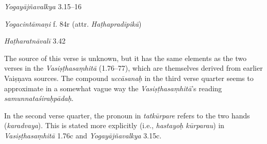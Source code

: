 \begin{ekdosis}
\begin{sources}[hp01_030]
\emph{Yogayājñavalkya} 3.15–16

\begin{versinnote}
\end{versinnote}

\end{sources}

\begin{testimonia}[hp01_030]
\emph{Yogacintāmaṇi} f. 84r (attr. \emph{Haṭhapradīpikā})

\begin{versinnote}
\end{versinnote}

\emph{Haṭharatnāvalī} 3.42

\begin{versinnote}
\end{versinnote}

\end{testimonia}

\begin{philcomm}[hp01_030]
%
The source of this verse is unknown, but it has the same elements as the two verses in the \emph{Vasiṣṭhasaṃhitā} (1.76–77), which are themselves derived from earlier Vaiṣṇava sources. The compound \emph{uccāsanaḥ} in the third verse quarter seems to approximate in a somewhat vague way the \emph{Vasiṣṭhasaṃhitā}’s reading \emph{samunnataśiraḥpādaḥ}. 
 
In the second verse quarter, the pronoun in \emph{tatkūrpare} refers to the two hands (\emph{karadvaya}). This is stated more explicitly (i.e., \emph{hastayoḥ kūrparau}) in \emph{Vasiṣṭhasaṃhitā} 1.76c and \emph{Yogayājñavalkya} 3.15c.
\end{philcomm}


\end{ekdosis}
